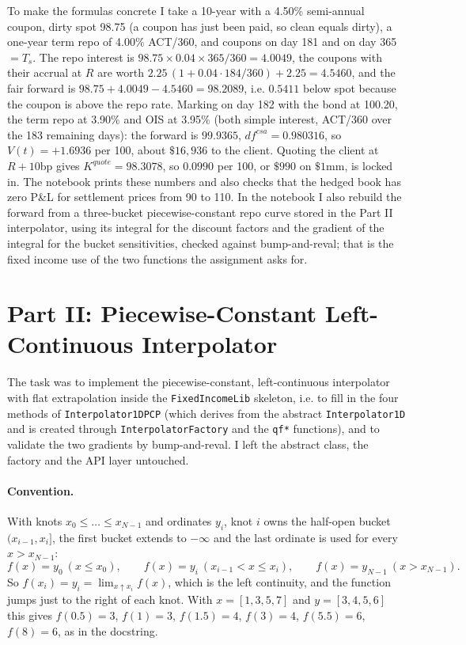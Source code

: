 \documentclass[11pt]{article}
\newcommand{\code}[1]{\texttt{#1}}
\begin{document}
To make the formulas concrete I take a 10-year with a 4.50\% semi-annual coupon, dirty spot 98.75 (a coupon has just been paid, so clean equals dirty), a one-year term repo of 4.00\% ACT/360, and coupons on day 181 and on day 365 $= T_s$. The repo interest is $98.75 \times 0.04 \times 365/360 = 4.0049$, the coupons with their accrual at $R$ are worth $2.25\,(1 + 0.04 \cdot 184/360) + 2.25 = 4.5460$, and the fair forward is $98.75 + 4.0049 - 4.5460 = 98.2089$, i.e. $0.5411$ below spot because the coupon is above the repo rate. Marking on day 182 with the bond at 100.20, the term repo at 3.90\% and OIS at 3.95\% (both simple interest, ACT/360 over the 183 remaining days): the forward is $99.9365$, $df^{csa} = 0.980316$, so $V(t) = +1.6936$ per 100, about $\$16{,}936$ to the client. Quoting the client at $R + 10$bp gives $K^{quote} = 98.3078$, so $0.0990$ per 100, or $\$990$ on $\$1$mm, is locked in. The notebook prints these numbers and also checks that the hedged book has zero P\&L for settlement prices from 90 to 110. In the notebook I also rebuild the forward from a three-bucket piecewise-constant repo curve stored in the Part II interpolator, using its integral for the discount factors and the gradient of the integral for the bucket sensitivities, checked against bump-and-reval; that is the fixed income use of the two functions the assignment asks for.

\section*{Part II: Piecewise-Constant Left-Continuous Interpolator}

The task was to implement the piecewise-constant, left-continuous interpolator with flat extrapolation inside the
\code{FixedIncomeLib} skeleton, i.e. to fill in the four methods of \code{Interpolator1DPCP} (which derives from the abstract
\code{Interpolator1D} and is created through \code{InterpolatorFactory} and the \code{qf*} functions), and to validate the two
gradients by bump-and-reval. I left the abstract class, the factory and the API layer untouched.

\paragraph{Convention.} With knots $x_0 \le \dots \le x_{N-1}$ and ordinates $y_i$, knot $i$ owns the half-open bucket
$(x_{i-1}, x_i]$, the first bucket extends to $-\infty$ and the last ordinate is used for every $x > x_{N-1}$:
\[
f(x) = y_0 \ (x \le x_0), \qquad f(x) = y_i \ (x_{i-1} < x \le x_i), \qquad f(x) = y_{N-1} \ (x > x_{N-1}).
\]
So $f(x_i) = y_i = \lim_{x \uparrow x_i} f(x)$, which is the left continuity, and the function jumps just to the right of each knot.
With $x = [1,3,5,7]$ and $y = [3,4,5,6]$ this gives $f(0.5) = 3$, $f(1) = 3$, $f(1.5) = 4$, $f(3) = 4$, $f(5.5) = 6$, $f(8) = 6$,
as in the docstring.
\end{document}
